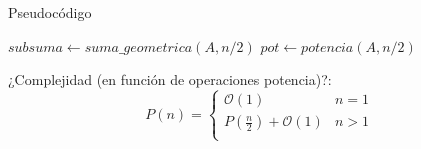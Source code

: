 \documentclass[pdf]{beamer}
\begin{document}
\begin{frame}{Pseudocódigo}
    
\begin{algorithmic}

	\State {} 
    \EndIf

    \vspace{0.5em}
    \State $subsuma \gets suma\_geometrica(A, n/2)$ 
    \vspace{0.5em}
    \State $pot \gets potencia(A, n/2)$ 
    \vspace{0.5em}
    
    \State {} 
    \vspace{0.5em}
    
\EndFunction

\pause

¿Complejidad (en función de operaciones potencia)?: 
\pause
 \[ P(n) =  \begin{cases} 
    \mathcal{O}(1) & n = 1 \\
    P(\frac{n}{2}) + \mathcal{O}(1) & n > 1 \\ 
   \end{cases}
 \]


\end{algorithmic}

\end{frame}
\end{document}
